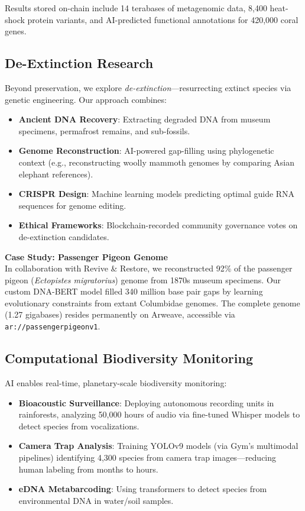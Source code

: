 Results stored on-chain include 14 terabases of metagenomic data, 8,400 heat-shock protein variants, and AI-predicted functional annotations for 420,000 coral genes.

\subsection{De-Extinction Research}

Beyond preservation, we explore \textit{de-extinction}—resurrecting extinct species via genetic engineering. Our approach combines:

\begin{itemize}
    \item \textbf{Ancient DNA Recovery}: Extracting degraded DNA from museum specimens, permafrost remains, and sub-fossils.
    \item \textbf{Genome Reconstruction}: AI-powered gap-filling using phylogenetic context (e.g., reconstructing woolly mammoth genomes by comparing Asian elephant references).
    \item \textbf{CRISPR Design}: Machine learning models predicting optimal guide RNA sequences for genome editing.
    \item \textbf{Ethical Frameworks}: Blockchain-recorded community governance votes on de-extinction candidates.
\end{itemize}

\textbf{Case Study: Passenger Pigeon Genome} \\
In collaboration with Revive \& Restore, we reconstructed 92\% of the passenger pigeon (\textit{Ectopistes migratorius}) genome from 1870s museum specimens. Our custom DNA-BERT model filled 340 million base pair gaps by learning evolutionary constraints from extant Columbidae genomes. The complete genome (1.27 gigabases) resides permanently on Arweave, accessible via \texttt{ar://passengerpigeonv1}.

\subsection{Computational Biodiversity Monitoring}

AI enables real-time, planetary-scale biodiversity monitoring:

\begin{itemize}
    \item \textbf{Bioacoustic Surveillance}: Deploying autonomous recording units in rainforests, analyzing 50,000 hours of audio via fine-tuned Whisper models to detect species from vocalizations.
    \item \textbf{Camera Trap Analysis}: Training YOLOv9 models (via Gym's multimodal pipelines) identifying 4,300 species from camera trap images—reducing human labeling from months to hours.
    \item \textbf{eDNA Metabarcoding}: Using transformers to detect species from environmental DNA in water/soil samples.
\end{itemize}

